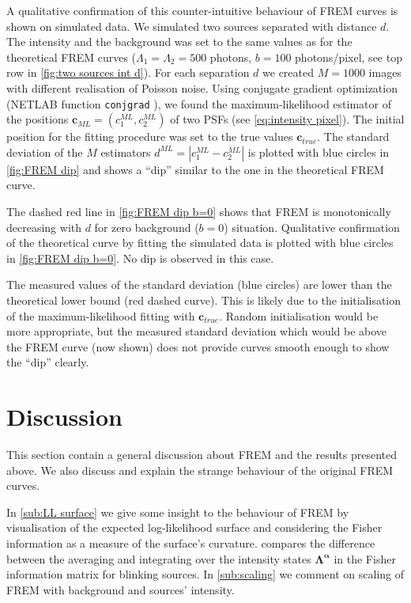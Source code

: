 A qualitative confirmation of this counter-intuitive behaviour of FREM curves is shown on simulated data. We simulated two sources separated with distance $d$. The intensity and the background was set to the same values as for the theoretical FREM curves ($\Lambda_1=\Lambda_2=500$ photons, $b=100$ photons/pixel, see top row in \autoref{fig:two sources int d}). For each separation $d$ we created $M=1000$ images with different realisation of Poisson noise. Using conjugate gradient optimization (NETLAB function {\tt conjgrad} \cite{Nabney}), we found the maximum-likelihood estimator of the positions $\bm{c}_{ML}=(c^{ML}_1,c^{ML}_2)$ of two PSFs (see \autoref{eq:intensity pixel}). The initial position for the fitting procedure was set to the true values $\bm{c}_{true}$. The standard deviation of the $M$ estimators $d^{ML}=|c^{ML}_1-c^{ML}_2|$ is plotted with blue circles in \autoref{fig:FREM dip} and shows a ``dip'' similar to the one in the theoretical FREM curve.

The dashed red line in \autoref{fig:FREM dip b=0} shows that FREM is monotonically decreasing with $d$ for zero background ($b=0$) situation. Qualitative confirmation of the theoretical curve by fitting the simulated data is plotted with blue circles in \autoref{fig:FREM dip b=0}. No dip is observed in this case. 

The measured values of the standard deviation (blue circles) are lower than the theoretical lower bound (red dashed curve). This is likely due to the initialisation of the maximum-likelihood fitting with $\bm{c}_{true}$. Random initialisation would be more appropriate, but the measured standard deviation which would be above the FREM curve (now shown) does not provide curves smooth enough to show the ``dip'' clearly.




\clearpage
\section{Discussion\label{sec:FREM discussion}}

This section contain a general discussion about FREM and the results presented above. We also discuss and explain the strange behaviour of the original FREM curves. 

In \autoref{sub:LL surface} we give some insight to the behaviour of FREM by visualisation of the expected log-likelihood surface and considering the Fisher information as a measure of the surface's curvature.  compares the difference between the averaging and integrating over the intensity states $\bm{\Lambda^\alpha}$ in the Fisher information matrix for blinking sources. In \autoref{sub:scaling} we comment on scaling of FREM with background and sources' intensity.  

